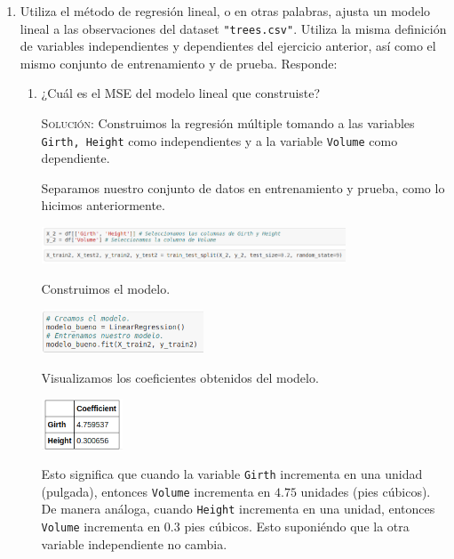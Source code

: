 \documentclass[letterpaper,11pt]{article}
\begin{document}
\begin{enumerate}
    \item Utiliza el método de regresión lineal, o en otras palabras, ajusta 
    un modelo lineal a las observaciones del dataset \texttt{"trees.csv"}. 
    Utiliza la misma definición de variables independientes y dependientes del 
    ejercicio anterior, así como el mismo conjunto de entrenamiento y de prueba.
    Responde:
    \begin{enumerate}
        \item ¿Cuál es el MSE del modelo lineal que construiste?
        
        \textsc{Solución:} Construimos la regresión múltiple tomando a las 
        variables \texttt{Girth, Height} como independientes y a la variable 
        \texttt{Volume} como dependiente. 

        Separamos nuestro conjunto de datos en entrenamiento y prueba, como 
        lo hicimos anteriormente.
        \begin{center}
            \includegraphics[width=0.75\textwidth]{imagenes/train_lineal.png}
        \end{center}

        Construimos el modelo.
        \begin{center}
            \includegraphics[width=0.4\textwidth]{imagenes/modelo_lineal.png}
        \end{center}

        Visualizamos los coeficientes obtenidos del modelo.
        \begin{center}
            \includegraphics[width=0.2\textwidth]{imagenes/coef.png}
        \end{center}

        Esto significa que cuando la variable \texttt{Girth} incrementa en una 
        unidad (pulgada), entonces \texttt{Volume} incrementa en $4.75$ 
        unidades (pies cúbicos). De manera análoga, cuando \texttt{Height} 
        incrementa en una unidad, entonces \texttt{Volume} incrementa en 
        $0.3$ pies cúbicos. Esto suponiéndo que la otra variable independiente
        no cambia.


\end{enumerate}
\end{enumerate}
\end{document}
